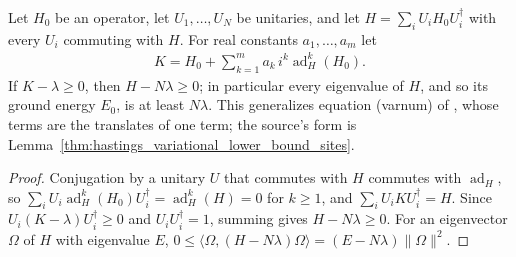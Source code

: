 \begin{lemma}
    \label{thm:hastings_variational_lower_bound}
    \leanok
    Let $H_0$ be an operator, let $U_1,\dots,U_N$ be unitaries, and let
    $H=\sum_iU_iH_0U_i^\dagger$ with every $U_i$ commuting with $H$. For real
    constants $a_1,\dots,a_m$ let
    \begin{align}
        K=H_0+\sum_{k=1}^ma_k\,i^k\operatorname{ad}_H^k(H_0).
    \end{align}
    If $K-\lambda\ge0$, then $H-N\lambda\ge0$; in particular every eigenvalue
    of $H$, and so its ground energy $E_0$, is at least $N\lambda$. This
    generalizes equation (varnum) of \cite{Hastings2006Solving}, whose terms are
    the translates of one term; the source's form is
    Lemma~\ref{thm:hastings_variational_lower_bound_sites}.
\end{lemma}
\begin{proof}\leanok
    Conjugation by a unitary $U$ that commutes with $H$ commutes with
    $\operatorname{ad}_H$, so
    $\sum_iU_i\operatorname{ad}_H^k(H_0)U_i^\dagger=\operatorname{ad}_H^k(H)=0$
    for $k\ge1$, and $\sum_iU_iKU_i^\dagger=H$. Since $U_i(K-\lambda)U_i^\dagger\ge0$
    and $U_iU_i^\dagger=1$, summing gives $H-N\lambda\ge0$. For an eigenvector
    $\Omega$ of $H$ with eigenvalue $E$,
    $0\le\langle\Omega,(H-N\lambda)\Omega\rangle=(E-N\lambda)\|\Omega\|^2$.
\end{proof}

